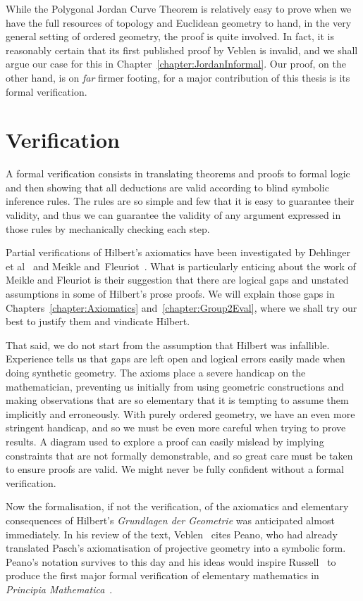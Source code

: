 While the Polygonal Jordan Curve Theorem is relatively easy to prove when we have the full resources of topology and Euclidean geometry to hand, in the very general setting of ordered geometry, the proof is quite involved. In fact, it is reasonably certain that its first published proof by Veblen is invalid, and we shall argue our case for this in Chapter~\ref{chapter:JordanInformal}. Our proof, on the other hand, is on \emph{far} firmer footing, for a major contribution of this thesis is its formal verification.

\section{Verification}
A formal verification consists in translating theorems and proofs to formal logic and then showing that all deductions are valid according to blind symbolic inference rules. The rules are so simple and few that it is easy to guarantee their validity, and thus we can guarantee the validity of any argument expressed in those rules by mechanically checking each step.

Partial verifications of Hilbert's axiomatics have been investigated by Dehlinger et al~\cite{DehlingerFOG} and Meikle and~Fleuriot~\cite{MeikleFleuriotFormalizingHilbert}. What is particularly enticing about the work of Meikle and Fleuriot is their suggestion that there are logical gaps and unstated assumptions in some of Hilbert's prose proofs. We will explain those gaps in Chapters~\ref{chapter:Axiomatics} and~\ref{chapter:Group2Eval}, where we shall try our best to justify them and vindicate Hilbert.

That said, we do not start from the assumption that Hilbert was infallible. Experience tells us that gaps are left open and logical errors easily made when doing synthetic geometry. The axioms place a severe handicap on the mathematician, preventing us initially from using geometric constructions and making observations that are so elementary that it is tempting to assume them implicitly and erroneously. With purely ordered geometry, we have an even more stringent handicap, and so we must be even more careful when trying to prove results. A diagram used to explore a proof can easily mislead by implying constraints that are not formally demonstrable, and so great care must be taken to ensure proofs are valid. We might never be fully confident without a formal verification.

Now the formalisation, if not the verification, of the axiomatics and elementary consequences of Hilbert's \emph{Grundlagen der Geometrie} was anticipated almost immediately. In his review of the text, Veblen~\cite{VeblenHilbertReview} cites Peano, who had already translated Pasch's axiomatisation of projective geometry into a symbolic form. Peano's notation survives to this day and his ideas would inspire Russell~\cite{PrinciplesOfMathematics} to produce the first major formal verification of elementary mathematics in \emph{Principia Mathematica}~\cite{Principia}.

